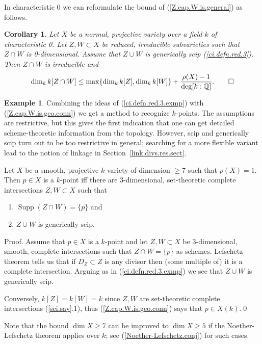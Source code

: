 \documentclass{amsart}
\newtheorem{cor}[thm]{Corollary}
\theoremstyle{definition}
\newtheorem{exmp}[thm]{Example}
\theoremstyle{remark}
\newcommand{\q}[0]{{\mathbb Q}}
\newcommand{\supp}[0]{\operatorname{Supp}}
\begin{document}
\medskip


In characteristic 0 we can reformulate the bound of (\ref{Z.cap.W.is.general}) as follows.

\begin{cor} \label{Z.cap.W.is.general.cor}
 Let $X$ be a normal, projective variety over a field $k$ of characteristic 0.
 Let $Z,W\subset X$ be reduced, irreducible subvarieties such  that  $Z\cap W$ is 0-dimensional. Assume that  $Z\cup W$ is generically scip (\ref{ci.defn.red.3}). Then
  $Z\cap W$ is irreducible and
$$
\dim_k k[Z\cap W]\leq \max\{\dim_k k[Z], \dim_k k[W]\}+ \frac{\rho(X)-1}{\deg [k:\q]}. \qed
$$
\end{cor}




\begin{exmp}\label{k.pts.dim.7.exmp} Combining the ideas of (\ref{ci.defn.red.3.exmp}) with (\ref{Z.cap.W.is.geo.conn}) we get a method to recognize $k$-points. The assumptions are restrictive, but this gives the first indication that one can get detailed scheme-theoretic information from the topology. However, scip and generically scip turn out to be too restrictive in general; searching for a more flexible variant  lead to the notion of  linkage in Section~\ref{link.divs.res.sect}.

\medskip
{}  Let $X$ be a smooth, projective $k$-variety of dimension $\geq 7$ such that  $\rho(X)=1$.
Then $p\in X$ is a $k$-point iff there are 3-dimensional, set-theoretic complete intersections    $Z,W\subset X$
such that 
\begin{enumerate}
\item $\supp(Z\cap W)=\{p\}$ and
\item $Z\cup W$ is generically scip.
\end{enumerate}
\medskip

Proof. Assume that $p\in X$ is a $k$-point and let
$Z,W\subset X$ be 3-dimensional, smooth,  complete intersections such that
$Z\cap W=\{p\}$ as schemes. Lefschetz theorem tells us that if $D_Z\subset Z$ is any divisor then (some multiple of) it is a complete intersection. 
Arguing as in (\ref{ci.defn.red.3.exmp}) we see that $Z\cup W$ is generically scip.

Conversely, $k[Z]=k[W]=k$ since $Z,W$ are set-theoretic complete intersections (\ref{sci.say}.1), thus  (\ref{Z.cap.W.is.geo.conn}) says that $p\in X(k)$.\qed
\medskip

Note that the bound $\dim X\geq 7$ can be improved to $\dim X\geq 5$ if
the Noether-Lefschetz theorem applies over $k$; see (\ref{Noether-Lefschetz.conj}) for such cases.
\end{exmp}
\end{document}
